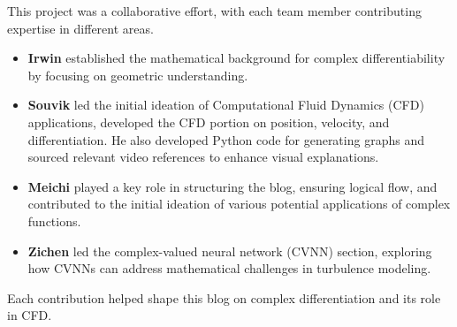 \documentclass[a4paper,10.5pt]{article}
\begin{document}
This project was a collaborative effort, with each team member contributing expertise in different areas.

\begin{itemize}
    \item \textbf{Irwin} established the mathematical background for complex differentiability by focusing on geometric understanding.
    \item \textbf{Souvik} led the initial ideation of Computational Fluid Dynamics (CFD) applications, developed the CFD portion on position, velocity, and differentiation. He also developed Python code for generating graphs and sourced relevant video references to enhance visual explanations.
    \item \textbf{Meichi} played a key role in structuring the blog, ensuring logical flow, and contributed to the initial ideation of various potential applications of complex functions.
    \item \textbf{Zichen} led the complex-valued neural network (CVNN) section, exploring how CVNNs can address mathematical challenges in turbulence modeling.
\end{itemize}

Each contribution helped shape this blog on complex differentiation and its role in CFD.
\end{document}
